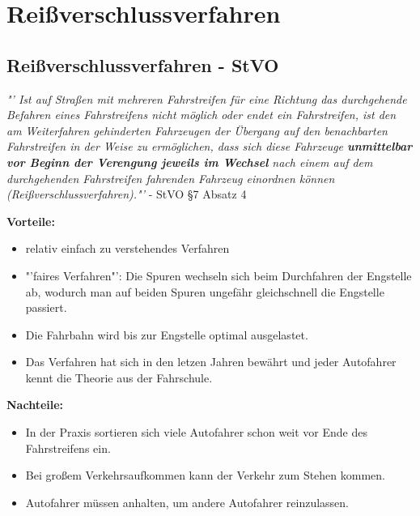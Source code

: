 \chapter{Reißverschlussverfahren}
\section{Reißverschlussverfahren - StVO}
\begin{center}
	\textit{"' Ist auf Straßen mit mehreren Fahrstreifen für eine Richtung das durchgehende Befahren eines Fahrstreifens nicht möglich oder endet ein Fahrstreifen, ist den am Weiterfahren gehinderten Fahrzeugen der Übergang auf den benachbarten Fahrstreifen in der Weise zu ermöglichen, dass sich diese Fahrzeuge \textbf{unmittelbar vor Beginn der Verengung jeweils im Wechsel} nach einem auf dem durchgehenden Fahrstreifen fahrenden Fahrzeug einordnen können (Reißverschlussverfahren)."'} - StVO \S 7 Absatz 4 \cite{StrassenVerkehrsBehorde.01.04.2013}
\end{center}
\textbf{Vorteile:} 
\begin{itemize}
	\item relativ einfach zu verstehendes Verfahren
\item "'faires Verfahren"': Die Spuren wechseln sich beim Durchfahren der Engstelle ab, wodurch man auf beiden Spuren ungefähr gleichschnell die Engstelle passiert.
\item Die Fahrbahn wird bis zur Engstelle optimal ausgelastet. \cite{Engelmann.2003}
\item Das Verfahren hat sich in den letzen Jahren bewährt und jeder Autofahrer kennt die Theorie aus der Fahrschule.
\end{itemize}
\textbf{Nachteile:}
\begin{itemize}
	\item In der Praxis sortieren sich viele Autofahrer schon weit vor Ende des Fahrstreifens ein.
\item Bei großem Verkehrsaufkommen kann der Verkehr zum Stehen kommen.
\item Autofahrer müssen anhalten, um andere Autofahrer reinzulassen.
\end{itemize}
\newpage

